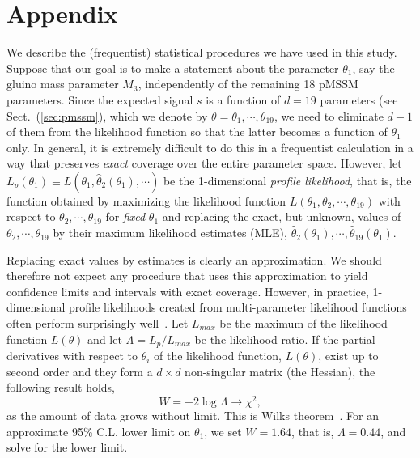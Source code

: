 \section*{Appendix}
\label{sec:stat}
We describe the (frequentist) 
statistical procedures we have used in this study.  Suppose 
that our goal is to make a statement about the parameter $\theta_1$,
say the gluino mass
parameter $M_3$, independently of the remaining 18 pMSSM parameters. Since the 
expected signal $s$ is a function of  $d = 19$ parameters (see Sect.~(\ref{sec:pmssm}),
which we denote by $\theta = \theta_1,\cdots,\theta_{19}$,  we need to eliminate $d - 1$ of them from the likelihood function so that the latter becomes a function of $\theta_1$ only. In general, it is extremely difficult to do this in 
a frequentist calculation in a way that preserves \emph{exact} coverage over the entire parameter
space. However, let $L_p(\theta_1) \equiv L(\theta_1, \hat{\theta}_2(\theta_1), \cdots)$ be the 
1-dimensional \emph{profile likelihood}, that is, the function obtained by maximizing the likelihood function $L(\theta_1, \theta_2, \cdots, \theta_{19})$ with respect to $\theta_2,\cdots,\theta_{19}$ for \emph{fixed} $\theta_1$ and replacing the exact, but unknown, values of $\theta_2,\cdots,\theta_{19}$
by their maximum likelihood estimates (MLE),  $\hat{\theta}_2(\theta_1),\cdots,\hat{\theta}_{19}(\theta_1)$. 

Replacing exact values by estimates is clearly an approximation. We should therefore not
expect any procedure that uses this approximation to yield confidence limits and intervals
with exact coverage. However, in practice, 1-dimensional profile likelihoods created from
multi-parameter likelihood functions often perform
surprisingly well~\cite{James}.
Let $L_{max}$ be the maximum of the likelihood function $L(\theta)$ and let 
$\Lambda = L_p /  L_{max}$ be the likelihood ratio. 
If the partial derivatives with respect to $\theta_i$ of the likelihood function, $L(\theta)$, exist up to second order and they form a $d \times d$ non-singular matrix (the Hessian), 
the following result holds,
\begin{equation}
    W = -2\log\Lambda \rightarrow \chi^2,
\end{equation}
as the amount of data grows without limit. This is  Wilks theorem~\cite{Wilks, James}. For an 
approximate 95\% C.L. lower limit on $\theta_1$, we set $W = 1.64$, that is, $\Lambda = 0.44$,
and solve for the lower limit.

